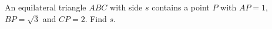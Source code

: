 An equilateral triangle $ABC$ with side $s$ contains a point $P$ with $AP=1$, $BP=\sqrt3$ and $CP=2$. Find $s$.
